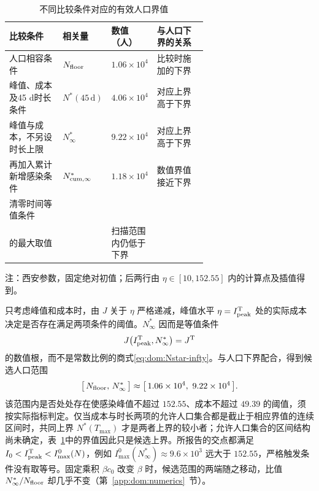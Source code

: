 \begin{table}[htbp]
\centering\small
\setlength{\tabcolsep}{3.5pt}
\renewcommand{\arraystretch}{1.25}
\begin{threeparttable}
\caption{不同比较条件对应的有效人口界值}
\label{tab:dom:thresholds}
\begin{tabularx}{\linewidth}{@{}>{\raggedright\arraybackslash}p{0.27\linewidth}>{\centering\arraybackslash}p{0.21\linewidth}>{\centering\arraybackslash}p{0.16\linewidth}>{\raggedright\arraybackslash}X@{}}
\toprule
比较条件 & 相关量 & 数值（人） & 与人口下界的关系\\
\midrule
人口相容条件 & $N_{\rm floor}$ & $1.06\times10^4$ & 比较时施加的下界\\
峰值、成本及45 d时长条件 & $N^*(45\,\mathrm d)$ & $4.06\times10^4$ & 对应上界高于下界\\
峰值与成本，不另设时长上限 & $N^*_{\infty}$ & $9.22\times10^4$ & 对应上界高于下界\\
再加入累计新增感染条件 & $N^*_{\rm cum,\infty}$ & $1.18\times10^4$ & 数值界值接近下界\\
清零时间等值条件 & \makecell{$N_{\rm clr}(\eta)$\\的最大取值} & 5184 & 扫描范围内仍低于下界\\
\bottomrule
\end{tabularx}
\begin{tablenotes}[flushleft]\footnotesize
\item 注：西安参数，固定绝对初值；后两行由 $\eta\in[10,152.55]$ 内的计算点及插值得到。
\end{tablenotes}
\end{threeparttable}
\end{table}

只考虑峰值和成本时，由 $J$ 关于 $\eta$ 严格递减，峰值水平 $\eta=I_{\rm peak}^{\rm T}$ 处的实际成本决定是否存在满足两项条件的阈值。$N^\ast_\infty$ 因而是等值条件
\[
J\bigl(I_{\rm peak}^{\rm T},N^\ast_\infty\bigr)=J^{\rm T}
\]
的数值根，而不是常数比例的商式\eqref{eq:dom:Nstar-infty}。与人口下界配合，得到候选人口范围
\begin{equation}
  \bigl[\,N_{\rm floor},\,N^\ast_\infty\,\bigr]
  \approx\bigl[\,1.06\times10^{4},\ 9.22\times10^{4}\,\bigr].
  \label{eq:dom:main-interval}
\end{equation}
该范围内是否处处存在使感染峰值不超过 $152.55$、成本不超过 $49.39$ 的阈值，须按实际指标判定。仅当成本与时长两项的允许人口集合都是截止于相应界值的连续区间时，共同上界 $N^\ast(T_{\max})$ 才是两者上界的较小者；允许人口集合的区间结构尚未确定，表~\ref{tab:dom:thresholds}中的界值因此只是候选上界。所报告的交点都满足 $I_0<I_{\rm peak}^{\rm T}<I_{\max}^{0}(N)$，例如 $I_{\max}^{0}(N^\ast_\infty)\approx9.6\times10^{3}$ 远大于 $152.55$，严格触发条件没有取等号。固定乘积 $\beta c_0$ 改变 $\beta$ 时，候选范围的两端随之移动，比值 $N^\ast_\infty/N_{\rm floor}$ 却几乎不变（第~\ref{app:dom:numerics}~节）。


